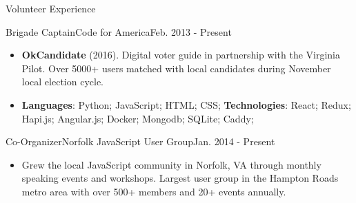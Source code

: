\documentclass[]{mcdowellcv}
\begin{document}
    \begin{cvsection}{Volunteer Experience}
        \begin{cvsubsection}{Brigade Captain}{Code for America}{Feb. 2013 - Present}
            \begin{itemize}
                \item \textbf{OkCandidate} (2016). Digital voter guide in partnership with the Virginia Pilot. Over 5000+ users matched with local candidates during November local election cycle.
            \end{itemize}
            \begin{itemize}
                 \item \textbf{Languages}:  Python; JavaScript; HTML; CSS; \newline
                \textbf{Technologies}: React; Redux; Hapi.js; Angular.js; Docker; Mongodb; SQLite; Caddy;
            \end{itemize}

        \end{cvsubsection}

        \begin{cvsubsection}{Co-Organizer}{Norfolk JavaScript User Group}{Jan. 2014 - Present}
            \begin{itemize}
                \item Grew the local JavaScript community in Norfolk, VA through monthly speaking events and workshops. Largest user group in the Hampton Roads metro area with over 500+ members and 20+ events annually.
            \end{itemize}
        \end{cvsubsection}
    \end{cvsection}
\end{document}
